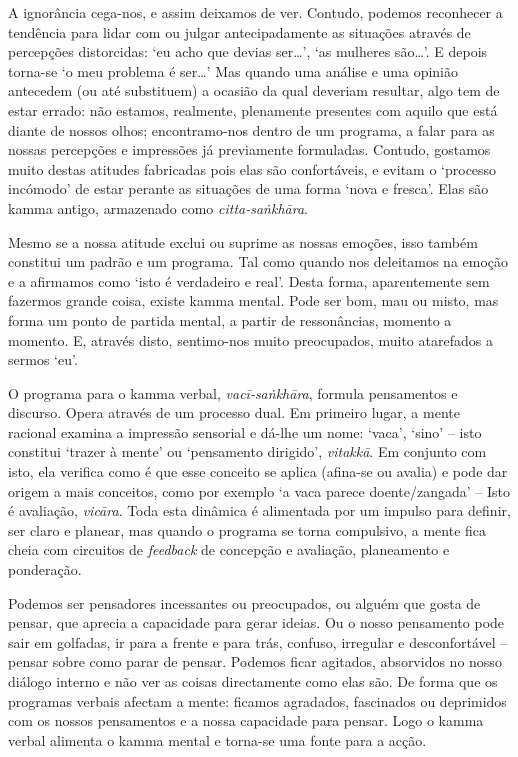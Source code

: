 A ignorância cega-nos, e assim deixamos de ver. Contudo, podemos reconhecer a tendência para lidar com ou julgar antecipadamente as situações através de percepções distorcidas: `eu acho que devias ser\ldots', `as mulheres são\ldots'. E depois torna-se `o meu problema é ser\ldots' Mas quando uma análise e uma opinião antecedem (ou até substituem) a ocasião da qual deveriam resultar, algo tem de estar errado: não estamos, realmente, plenamente presentes com aquilo que está diante de nossos olhos; encontramo-nos dentro de um programa, a falar para as nossas percepções e impressões já previamente formuladas. Contudo, gostamos muito destas atitudes fabricadas pois elas são confortáveis, e evitam o `processo incómodo' de estar perante as situações de uma forma `nova e fresca'. Elas são kamma antigo, armazenado como \emph{citta-saṅkhāra}.

Mesmo se a nossa atitude exclui ou suprime as nossas emoções, isso também constitui um padrão e um programa. Tal como quando nos deleitamos na emoção e a afirmamos como `isto é verdadeiro e real'. Desta forma, aparentemente sem fazermos grande coisa, existe kamma mental. Pode ser bom, mau ou misto, mas forma um ponto de partida mental, a partir de ressonâncias, momento a momento. E, através disto, sentimo-nos muito preocupados, muito atarefados a sermos `eu'.

O programa para o kamma verbal, \emph{vacī-saṅkhāra}, formula pensamentos e discurso. Opera através de um processo dual. Em primeiro lugar, a mente racional examina a impressão sensorial e dá-lhe um nome: `vaca', `sino' -- isto constitui `trazer à mente' ou `pensamento dirigido', \emph{vitakkā}. Em conjunto com isto, ela verifica como é que esse conceito se aplica (afina-se ou avalia) e pode dar origem a mais conceitos, como por exemplo `a vaca parece doente/zangada' -- Isto é avaliação, \emph{vicāra}. Toda esta dinâmica é alimentada por um impulso para definir, ser claro e planear, mas quando o programa se torna compulsivo, a mente fica cheia com circuitos de \emph{feedback} de concepção e avaliação, planeamento e ponderação.

Podemos ser pensadores incessantes ou preocupados, ou alguém que gosta de pensar, que aprecia a capacidade para gerar ideias. Ou o nosso pensamento pode sair em golfadas, ir para a frente e para trás, confuso, irregular e desconfortável -- pensar sobre como parar de pensar. Podemos ficar agitados, absorvidos no nosso diálogo interno e não ver as coisas directamente como elas são. De forma que os programas verbais afectam a mente: ficamos agradados, fascinados ou deprimidos com os nossos pensamentos e a nossa capacidade para pensar. Logo o kamma verbal alimenta o kamma mental e torna-se uma fonte para a acção.

